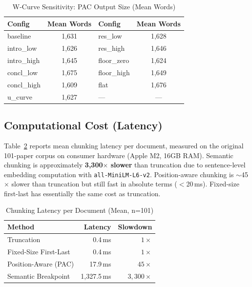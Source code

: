 \documentclass[journal]{IEEEtran}
\begin{document}
\begin{table}[h]
\centering
\caption{W-Curve Sensitivity: PAC Output Size (Mean Words)}
\label{tab:sensitivity}
\footnotesize
\begin{tabular}{lc|lc}
\toprule
\textbf{Config} & \textbf{Mean Words} & \textbf{Config} & \textbf{Mean Words} \\
\midrule
baseline & 1{,}631 & res\_low & 1{,}628 \\
intro\_low & 1{,}626 & res\_high & 1{,}646 \\
intro\_high & 1{,}645 & floor\_zero & 1{,}624 \\
concl\_low & 1{,}675 & floor\_high & 1{,}649 \\
concl\_high & 1{,}609 & flat & 1{,}676 \\
u\_curve & 1{,}627 & --- & --- \\
\bottomrule
\end{tabular}
\end{table}

\subsection{Computational Cost (Latency)}
\label{sec:latency}

Table~\ref{tab:latency} reports mean chunking latency per document, measured on the original 101-paper corpus on consumer hardware (Apple M2, 16GB RAM). Semantic chunking is approximately \textbf{3{,}300$\times$ slower} than truncation due to sentence-level embedding computation with \texttt{all-MiniLM-L6-v2}. Position-aware chunking is $\sim$45$\times$ slower than truncation but still fast in absolute terms ($<$20\,ms). Fixed-size first-last has essentially the same cost as truncation.

\begin{table}[h]
\centering
\caption{Chunking Latency per Document (Mean, n=101)}
\label{tab:latency}
\begin{tabular}{lrr}
\toprule
\textbf{Method} & \textbf{Latency} & \textbf{Slowdown} \\
\midrule
Truncation & 0.4\,ms & $1\times$ \\
Fixed-Size First-Last & 0.4\,ms & $1\times$ \\
Position-Aware (PAC) & 17.9\,ms & $45\times$ \\
Semantic Breakpoint & 1{,}327.5\,ms & $3{,}300\times$ \\
\bottomrule
\end{tabular}
\end{table}
\end{document}
